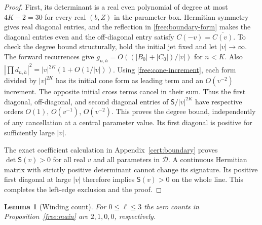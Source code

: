 \documentclass[11pt]{article}
\numberwithin{equation}{section}
\newtheorem{lemma}[theorem]{Lemma}
\theoremstyle{definition}
\theoremstyle{remark}
\begin{document}
\begin{proof}
First, its determinant is a real even polynomial of degree at most
$4K-2=30$ for every real $(b,Z)$ in the parameter box.  Hermitian
symmetry gives real diagonal entries, and the reflection in
\eqref{free:boundary-form} makes the diagonal entries even and the
off-diagonal entry satisfy $C(-v)=\overline{C(v)}$.  To check the degree
bound structurally, hold the initial jet fixed and let $|v|\to\infty$.
The forward recurrences give $g_{n,h}=O((|B_0|+|C_0|)/|v|)$ for
$n<K$.  Also $|\prod d_{n,h}|^2=|v|^{2K}(1+O(1/|v|))$.
Using \eqref{free:cone-increment}, each form divided by $|v|^{2K}$
has its initial cone form as leading term and an $O(v^{-2})$
increment.  The opposite initial cross terms cancel in their sum.
Thus the first diagonal, off-diagonal, and second diagonal entries of
$\mathsf S/|v|^{2K}$ have respective orders $O(1)$, $O(v^{-1})$,
$O(v^{-2})$.  This proves the degree bound, independently of any
cancellation at a central parameter value.  Its first diagonal is
positive for sufficiently large $|v|$.

The exact coefficient calculation in Appendix~\ref{cert:boundary}
proves $\det\mathsf S(v)>0$ for all real $v$ and all parameters in
$\mathcal D$.  A continuous Hermitian matrix with strictly positive
determinant cannot change its signature.  Its positive first diagonal
at large $|v|$ therefore implies $\mathsf S(v)>0$ on the whole line.
This completes the left-edge exclusion and the proof.
\end{proof}

\begin{lemma}[Winding count]\label{free:winding}
For $0\le\ell\le3$ the zero counts in Proposition~\ref{free:main} are
$2,1,0,0$, respectively.
\end{lemma}
\end{document}
